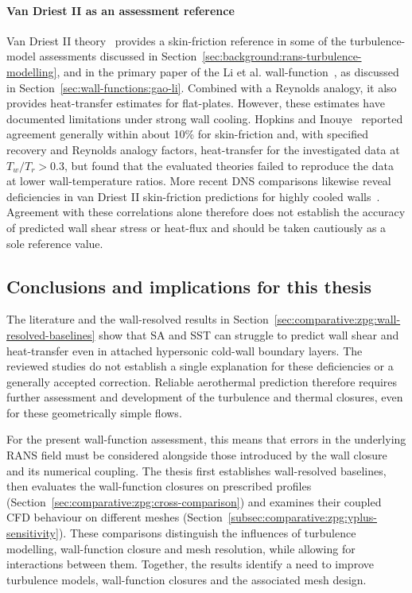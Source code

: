 \paragraph{Van Driest II as an assessment reference}

Van Driest II theory~\cite{van1956problem} provides a skin-friction reference in some of the turbulence-model assessments discussed in Section~\ref{sec:background:rans-turbulence-modelling}, and in the primary paper of the Li et al. wall-function~\cite{li2025WF}, as discussed in Section~\ref{sec:wall-functions:gao-li}. Combined with a Reynolds analogy, it also provides heat-transfer estimates for flat-plates. However, these estimates have documented limitations under strong wall cooling. Hopkins and Inouye~\cite{hopkins1971evaluation} reported agreement generally within about 10\% for skin-friction and, with specified recovery and Reynolds analogy factors, heat-transfer for the investigated data at \(T_w/T_r>0.3\), but found that the evaluated theories failed to reproduce the data at lower wall-temperature ratios. More recent DNS comparisons likewise reveal deficiencies in van Driest II skin-friction predictions for highly cooled walls~\cite{zhao2025revisiting}. Agreement with these correlations alone therefore does not establish the accuracy of predicted wall shear stress or heat-flux and should be taken cautiously as a sole reference value.

\subsection{Conclusions and implications for this thesis}

The literature and the wall-resolved results in Section~\ref{sec:comparative:zpg:wall-resolved-baselines} show that SA and SST can struggle to predict wall shear and heat-transfer even in attached hypersonic cold-wall boundary layers. The reviewed studies do not establish a single explanation for these deficiencies or a generally accepted correction. Reliable aerothermal prediction therefore requires further assessment and development of the turbulence and thermal closures, even for these geometrically simple flows.
\par\medskip

For the present wall-function assessment, this means that errors in the underlying RANS field must be considered alongside those introduced by the wall closure and its numerical coupling. The thesis first establishes wall-resolved baselines, then evaluates the wall-function closures on prescribed profiles (Section~\ref{sec:comparative:zpg:cross-comparison}) and examines their coupled CFD behaviour on different meshes (Section~\ref{subsec:comparative:zpg:yplus-sensitivity}). These comparisons distinguish the influences of turbulence modelling, wall-function closure and mesh resolution, while allowing for interactions between them. Together, the results identify a need to improve turbulence models, wall-function closures and the associated mesh design.